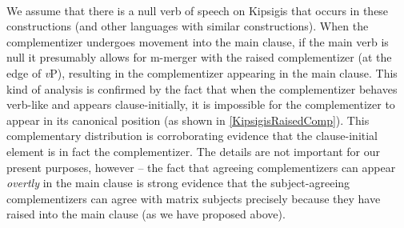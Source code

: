 \documentclass[output=paper
,modfonts
,nonflat
]{langsci/langscibook}
\begin{document}
\ea \label{KipsigisRaisedCompNegation}
\\
\begin{xlist}





\end{xlist} 
\z
\noindent We assume that there is a null verb of speech on Kipsigis that occurs in these constructions (and other languages with similar constructions). When the complementizer undergoes movement into the main clause, if the main verb is null it presumably allows for m-merger with the raised complementizer (at the edge of \textit{v}P), resulting in the complementizer appearing in the main clause. This kind of analysis is confirmed by the fact that when the complementizer behaves verb-like and appears clause-initially, it is impossible for the complementizer to appear in its canonical position (as shown in \ref{KipsigisRaisedComp}). This complementary distribution is corroborating evidence that the clause-initial element is in fact the complementizer. The details are not important for our present purposes, however -- the fact that agreeing complementizers can appear \textit{overtly} in the main clause is strong evidence that the subject-agreeing complementizers can agree with matrix subjects precisely because they have raised into the main clause (as we have proposed above).  
\end{document}
